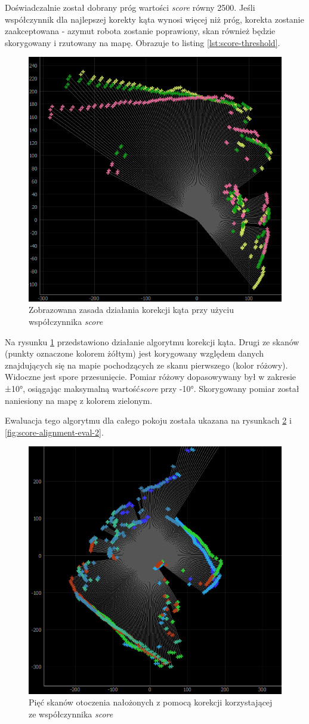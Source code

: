 Doświadczalnie został dobrany próg wartości \emph{score} równy 2500. Jeśli współczynnik dla najlepszej korekty kąta wynosi więcej niż próg, korekta zostanie zaakceptowana - azymut robota zostanie poprawiony, skan również będzie skorygowany i rzutowany na mapę. Obrazuje to listing \ref{lst:score-threshold}.

\begin{figure}[ht]
	\centering
		\includegraphics[width=0.6\linewidth]{rys/ScanBot-13-angular-alignment-1yellow-2pink-3correctedgreen.PNG}
	\caption{Zobrazowana zasada działania korekcji kąta przy użyciu współczynnika \emph{score}}
	\label{fig:score-alignment-rule}
\end{figure}

Na rysunku \ref{fig:score-alignment-rule} przedstawiono działanie algorytmu korekcji kąta. Drugi ze skanów (punkty oznaczone kolorem żółtym) jest korygowany względem danych znajdujących się na mapie pochodzących ze skanu pierwszego (kolor różowy). Widoczne jest spore przesunięcie. Pomiar różowy dopasowywany był w zakresie  ±10°, osiągając maksymalną wartość\emph{score} przy -10°. Skorygowany pomiar został naniesiony na mapę z kolorem zielonym.

Ewaluacja tego algorytmu dla całego pokoju została ukazana na rysunkach \ref{fig:score-alignment-eval-1} i \ref{fig:score-alignment-eval-2}.

\begin{figure}[ht]
	\centering
		\includegraphics[width=0.6\linewidth]{rys/ScanBot-14-angular-alignment.PNG}
	\caption{Pięć skanów otoczenia nałożonych z pomocą korekcji korzystającej ze współczynnika \emph{score}}
	\label{fig:score-alignment-eval-1}
\end{figure}

